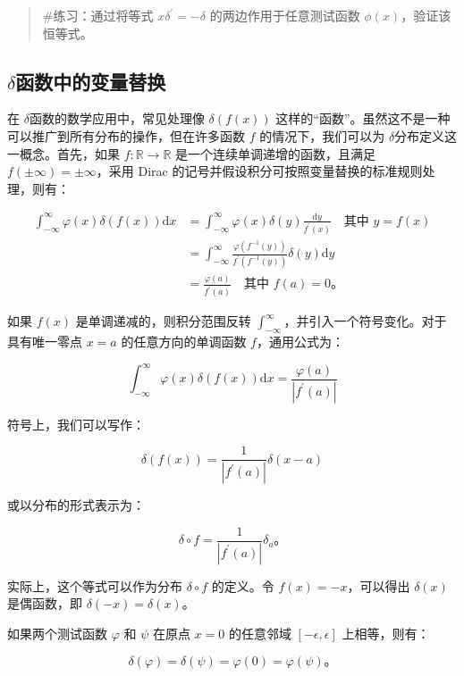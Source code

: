 \begin{quote}
\#练习：通过将等式 \(x \delta^{\prime} = -\delta\)
的两边作用于任意测试函数 \(\phi(x)\)，验证该恒等式。
\end{quote}

\subsection{$\delta$函数中的变量替换}\label{ux3b4-ux51fdux6570ux4e2dux7684ux53d8ux91cfux66ffux6362}

在 $\delta$函数的数学应用中，常见处理像 \(\delta(f(x))\)
这样的``函数''。虽然这不是一种可以推广到所有分布的操作，但在许多函数
\(f\) 的情况下，我们可以为 $\delta$分布定义这一概念。首先，如果
\(f: \mathbb{R} \to \mathbb{R}\) 是一个连续单调递增的函数，且满足
\(f(\pm \infty) = \pm \infty\)，采用 Dirac
的记号并假设积分可按照变量替换的标准规则处理，则有：

\[
\begin{aligned}
\int_{-\infty}^\infty \varphi(x) \delta(f(x)) \mathrm{d}x & = \int_{-\infty}^\infty \varphi(x) \delta(y) \frac{\mathrm{d}y}{f^{\prime}(x)} \quad \text{其中 } y = f(x) \\
& = \int_{-\infty}^\infty \frac{\varphi\left(f^{-1}(y)\right)}{f^{\prime}\left(f^{-1}(y)\right)} \delta(y) \mathrm{d}y \\
& = \frac{\varphi(a)}{f^{\prime}(a)} \quad \text{其中 } f(a) = 0。
\end{aligned}
\]

如果 \(f(x)\) 是单调递减的，则积分范围反转
\(\int_{-\infty}^\infty\)，并引入一个符号变化。对于具有唯一零点
\(x = a\) 的任意方向的单调函数 \(f\)，通用公式为：

\[
\int_{-\infty}^\infty \varphi(x) \delta(f(x)) \mathrm{d}x = \frac{\varphi(a)}{\left|f^{\prime}(a)\right|}
\]

符号上，我们可以写作：

\[
\delta(f(x)) = \frac{1}{\left|f^{\prime}(a)\right|} \delta(x - a)
\]

或以分布的形式表示为：

\[
\delta \circ f = \frac{1}{\left|f^{\prime}(a)\right|} \delta_a。
\]

实际上，这个等式可以作为分布 \(\delta \circ f\) 的定义。令
\(f(x) = -x\)，可以得出 \(\delta(x)\) 是偶函数，即
\(\delta(-x) = \delta(x)\)。

如果两个测试函数 \(\varphi\) 和 \(\psi\) 在原点 \(x=0\) 的任意邻域
\([-\epsilon, \epsilon]\) 上相等，则有：

\[
\delta(\varphi) = \delta(\psi) = \varphi(0) = \varphi(\psi)。
\]

